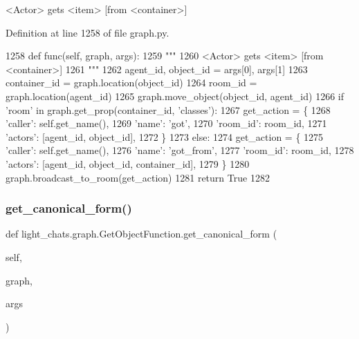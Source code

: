 \begin{DoxyVerb}<Actor> gets <item> [from <container>]
\end{DoxyVerb}
 

Definition at line 1258 of file graph.\+py.


\begin{DoxyCode}
1258     \textcolor{keyword}{def }func(self, graph, args):
1259         \textcolor{stringliteral}{"""}
1260 \textcolor{stringliteral}{        <Actor> gets <item> [from <container>]}
1261 \textcolor{stringliteral}{        """}
1262         agent\_id, object\_id = args[0], args[1]
1263         container\_id = graph.location(object\_id)
1264         room\_id = graph.location(agent\_id)
1265         graph.move\_object(object\_id, agent\_id)
1266         \textcolor{keywordflow}{if} \textcolor{stringliteral}{'room'} \textcolor{keywordflow}{in} graph.get\_prop(container\_id, \textcolor{stringliteral}{'classes'}):
1267             get\_action = \{
1268                 \textcolor{stringliteral}{'caller'}: self.get\_name(),
1269                 \textcolor{stringliteral}{'name'}: \textcolor{stringliteral}{'got'},
1270                 \textcolor{stringliteral}{'room\_id'}: room\_id,
1271                 \textcolor{stringliteral}{'actors'}: [agent\_id, object\_id],
1272             \}
1273         \textcolor{keywordflow}{else}:
1274             get\_action = \{
1275                 \textcolor{stringliteral}{'caller'}: self.get\_name(),
1276                 \textcolor{stringliteral}{'name'}: \textcolor{stringliteral}{'got\_from'},
1277                 \textcolor{stringliteral}{'room\_id'}: room\_id,
1278                 \textcolor{stringliteral}{'actors'}: [agent\_id, object\_id, container\_id],
1279             \}
1280         graph.broadcast\_to\_room(get\_action)
1281         \textcolor{keywordflow}{return} \textcolor{keyword}{True}
1282 
\end{DoxyCode}
\mbox{\label{classlight__chats_1_1graph_1_1GetObjectFunction_a95528a5a8694228805bad940519e6e0e}} 
\subsubsection{\texorpdfstring{get\+\_\+canonical\+\_\+form()}{get\_canonical\_form()}}
{\footnotesize\ttfamily def light\+\_\+chats.\+graph.\+Get\+Object\+Function.\+get\+\_\+canonical\+\_\+form (\begin{DoxyParamCaption}\item[{}]{self,  }\item[{}]{graph,  }\item[{}]{args }\end{DoxyParamCaption})}


